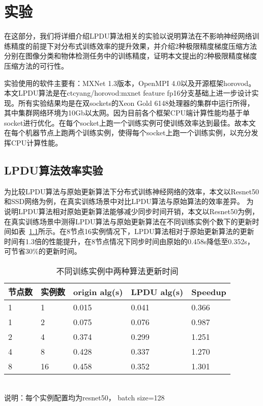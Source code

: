 \chapter{实验}

在这部分，我们将详细介绍LPDU算法相关的实验以说明算法在不影响神经网络训练精度的前提下对分布式训练效率的提升效果，并介绍2种极限精度梯度压缩方法分别在图像分类和物体检测任务中的训练精度，证明本文提出的2种极限精度梯度压缩方法的可行性。

实验使用的软件主要有：MXNet 1.3版本，OpenMPI 4.0以及开源框架horovod。本文LPDU算法是在ctcyang/horovod:mxnet feature fp16分支基础上进一步设计实现。所有实验结果均是在双sockets的Xeon Gold 6148处理器的集群中运行所得，其中集群网络环境为10Gb以太网。因为目前各个框架CPU端计算性能均基于单socket进行优化。在每个socket上跑一个训练实例可使训练效率达到最佳。故本文在每个机器节点上跑两个训练实例，使得每个socket上跑一个训练实例，以充分发挥CPU计算性能。

\section{LPDU算法效率实验}
为比较LPDU算法与原始更新算法下分布式训练神经网络的效率，本文以Resnet50和SSD网络为例，在真实训练场景中对比LPDU算法与原始算法的效率差异。
为说明LPDU算法相对原始更新算法能够减少同步时间开销，本文以Resnet50为例，在真实训练场景中测得LPDU算法与原始更新算法在不同训练实例个数下的更新时间如表~\ref{tab:fp32_bf16_real_update_time}所示。在8节点16实例情况下，LPDU算法相对于原始更新算法的更新时间有1.3倍的性能提升，在8节点情况下同步时间由原始的0.458s降低至0.352s，可节省30\%的更新时间。 

\begin{table}[htbp]
  \centering
  \caption{不同训练实例中两种算法更新时间}
  \label{tab:fp32_bf16_real_update_time}
  \begin{minipage}[t]{0.8\textwidth} 
    \begin{tabularx}{\linewidth}{|l|X|X|X|X|}
      \hline
      节点数 & 实例数 & origin alg(s) & LPDU alg(s) & Speedup\\
      \hline
1 & 1 & 0.015 & 0.041 & 0.366 \\
1 & 2 & 0.075 & 0.076 & 0.987 \\
2 & 4 & 0.374 & 0.299 & 1.251 \\
4 & 8 & 0.428 & 0.337 & 1.270 \\
8 & 16 & 0.458 & 0.352 & 1.301 \\
      \hline
    \end{tabularx}\\[2pt]
    \footnotesize
    说明：每个实例配置均为resnet50， batch size=128\\
  \end{minipage}
\end{table}


